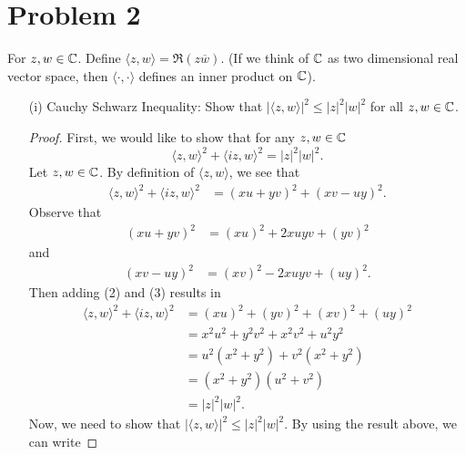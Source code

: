 \documentclass[a4paper]{article}
\begin{document}
    \section*{Problem 2}  For \( z,w \in \mathbb{C}  \). Define \( \langle z , w \rangle = \Re(z \overline{w}) \). (If we think of \(  \mathbb{C}  \) as two dimensional real vector space, then \( \langle \cdot  ,  \cdot  \rangle  \) defines an inner product on \( \mathbb{C}  \)). 
        \begin{enumerate}
            \item[(i)] Cauchy Schwarz Inequality: 
                Show that \( | \langle z , w \rangle |^{2} \leq | z |^{2} | w |^{2} \) for all \( z,w \in \mathbb{C}  \).
                \begin{proof}
                First, we would like to show that for any \( z,w \in \mathbb{C}  \)
                \[ \langle z , w \rangle^{2} + \langle iz , w \rangle^{2} = | z |^{2} | w |^{2}.    \]
                Let \( z,w \in \mathbb{C}  \). By definition of \( \langle z , w \rangle \), we see that 
                \begin{align*}
                    \langle z , w \rangle^{2} + \langle iz  , w  \rangle^{2} &= (xu + yv)^{2} + (xv - uy)^{2}. \tag{1}
    \end{align*}
    Observe that 
    \begin{align*}
        (xu + yv)^{2} &= (xu)^{2} + 2xuyv + (yv)^{2} \tag{2}
    \end{align*}
    and
    \begin{align*}
        (xv - uy)^{2} &= (xv)^{2} - 2xuyv + (uy)^{2}. \tag{3}
    \end{align*}
    Then adding (2) and (3) results in 
    \begin{align*}
        \langle z , w \rangle^{2} + \langle iz , w \rangle^{2} &= (xu)^{2} + (yv)^{2} + (xv)^{2} + (uy)^{2} \\
                                                               &= x^{2} u^{2} + y^{2} v^{2} + x^{2} v^{2} + u^{2} y^{2} \\
                                                               &= u^{2} (x^{2} + y^{2}) + v^{2} (x^{2} + y^{2}) \\
                                                               &= (x^{2} + y^{2}) (u^{2} + v^{2}) \\
                                                               &= | z  |^{2} | w |^{2}.
    \end{align*}
    Now, we need to show that \( | \langle z , w \rangle |^{2} \leq | z |^{2} | w |^{2}  \). By using the result above, we can write      

\end{proof}
\end{enumerate}
\end{document}
